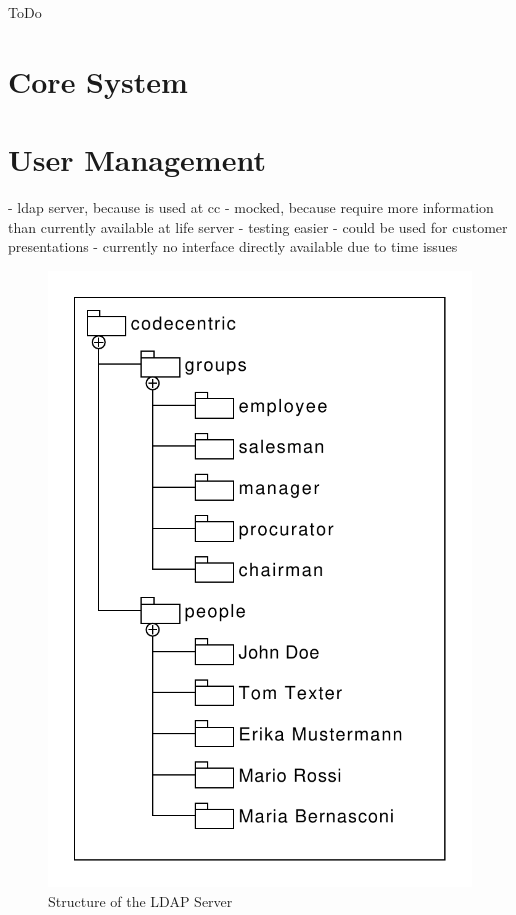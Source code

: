 ToDo

\section{Core System}

\section{User Management}
- ldap server, because is used at cc
- mocked, because require more information than currently available at life server
- testing easier
- could be used for customer presentations
- currently no interface directly available due to time issues

\begin{figure}[h!]
	\includegraphics[hight=3cm]{./implementation/images/ldap.pdf}
	\centering
	\caption{Structure of the LDAP Server}
	\label{fig:ldap}
\end{figure}

